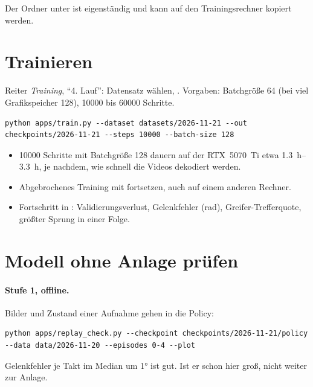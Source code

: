 Der Ordner unter  ist eigenständig und kann auf den Trainingsrechner kopiert
werden.

\section{Trainieren}
\label{sec:trainieren}

Reiter \emph{Training}, \enquote{4. Lauf}: Datensatz wählen, . Vorgaben:
Batchgröße 64 (bei viel Grafikspeicher 128), \num{10000} bis \num{60000} Schritte.

\begin{lstlisting}[style=ps]
python apps/train.py --dataset datasets/2026-11-21 --out checkpoints/2026-11-21 --steps 10000 --batch-size 128
\end{lstlisting}

\begin{itemize}
  \item \num{10000} Schritte mit Batchgröße 128 dauern auf der RTX~5070~Ti etwa
    \SIrange{1.3}{3.3}{\hour}, je nachdem, wie schnell die Videos dekodiert werden.
  \item Abgebrochenes Training mit  fortsetzen, auch auf einem anderen Rechner.
  \item Fortschritt in : Validierungsverlust, Gelenkfehler (rad),
    Greifer-Trefferquote, größter Sprung in einer Folge.
\end{itemize}


\section{Modell ohne Anlage prüfen}
\label{sec:pruefen}

\paragraph{Stufe 1, offline.} Bilder und Zustand einer Aufnahme gehen in die Policy:
\begin{lstlisting}[style=ps]
python apps/replay_check.py --checkpoint checkpoints/2026-11-21/policy --data data/2026-11-20 --episodes 0-4 --plot
\end{lstlisting}
Gelenkfehler je Takt im Median um \ang{1} ist gut. Ist er schon hier groß, nicht weiter zur
Anlage.

